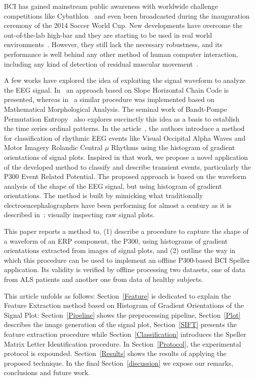\documentclass[utf8]{frontiersSCNS} %
\begin{document}
BCI has gained mainstream public awareness with worldwide challenge competitions like Cybathlon~\citep{Riener2014,cybathlon2} and even been broadcasted during the inauguration ceremony of the 2014 Soccer World Cup.  New developments have overcome the out-of-the-lab high-bar and they are starting to be used in real world environments~\citep{Guger2017,Huggins2016}.  However, they still lack the necessary robustness, and its performance is well behind any other method of human computer interaction, including any kind of detection of residual muscular movement~\citep{Clerc}.

A few works have explored the idea of exploiting the signal waveform to analyze the EEG signal.  In~\citep{Alvarado-Gonzalez2016} an approach based on Slope Horizontal Chain Code is presented, whereas in~\citep{Yamaguchi2009} a similar procedure was implemented based on Mathematical Morphological Analysis.  The seminal work of Bandt-Pompe Permutation Entropy~\citep{Berger2017} also explores succinctly this idea as a basis to establish the time series ordinal patterns.  In the article~\citep{Ramele2016},  the authors introduce a method for classification of rhythmic EEG events like Visual Occipital Alpha Waves  and Motor Imagery Rolandic Central $\mu$ Rhythms using the histogram of gradient orientations of signal plots.  Inspired in that work, we propose a novel application of the developed method to classify and describe transient events, particularly the P300 Event Related Potential.  
The proposed approach is based on the waveform analysis of the shape of the EEG signal, but using histogram of gradient orientations. The method is built by mimicking what traditionally electroencephalographers have been performing for almost a century as it is described in~\citep{Hartman2005}: visually inspecting raw signal plots.

This paper reports a method to, (1) describe a procedure to capture the shape of a waveform of an ERP component, the P300, using histograms of gradient orientations extracted from images of signal plots, and (2) outline the way in which this procedure can be used to implement an offline P300-based BCI Speller application. Its validity is verified by offline processing two datasets, one of data from ALS patients and another one from data of healthy subjects. 

This article unfolds as follows: Section~\ref{Feature} is dedicated to explain the Feature Extraction method based on Histogram of Gradient Orientations of the Signal Plot: Section~\ref{Pipeline} shows the preprocessing pipeline,  Section~\ref{Plot}  describes the image generation of the signal plot, Section~\ref{SIFT}  presents the feature extraction procedure while  Section~\ref{Classification}  introduces the Speller Matrix Letter Identification procedure.  In Section~\ref{Protocol}, the experimental protocol is expounded. Section~\ref{Results} shows the results of applying the proposed technique.  In the final Section~\ref{discussion}  we expose our remarks, conclusions and future work.
\end{document}
